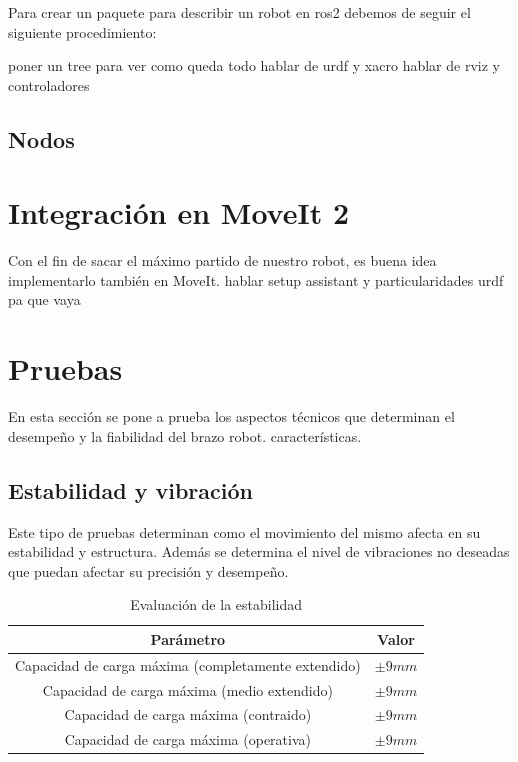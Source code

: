 Para crear un paquete para describir un robot en ros2 debemos de seguir el siguiente procedimiento:



poner un tree para ver como queda todo 
hablar de urdf y xacro
hablar de rviz y controladores



\subsection{Nodos}



\section{Integración en MoveIt 2}
Con el fin de sacar el máximo partido de nuestro robot, es buena idea implementarlo también en MoveIt.
hablar setup assistant y particularidades urdf pa que vaya
\section{Pruebas}
En esta sección se pone a prueba los aspectos técnicos que determinan el desempeño y la fiabilidad del brazo robot. 
características.

\subsection{Estabilidad y vibración}
Este tipo de pruebas determinan como el movimiento del mismo afecta en su estabilidad y estructura. Además se determina el nivel de 
vibraciones no deseadas que puedan afectar su precisión y desempeño.
\begin{table}[H]
\begin{center}
\begin{tabular}{|c|c|}
\hline
\textbf{Parámetro} & \textbf{Valor} \\
\hline
Capacidad de carga máxima (completamente extendido) & $\pm9mm$\\
Capacidad de carga máxima (medio extendido) & $\pm9mm$\\
Capacidad de carga máxima (contraido) & $\pm9mm$\\
Capacidad de carga máxima (operativa) & $\pm9mm$\\
\hline
\end{tabular}
\caption{Evaluación de la estabilidad}
\label{cuadro:evaluacion_estabilidad}
\end{center}
\end{table}

